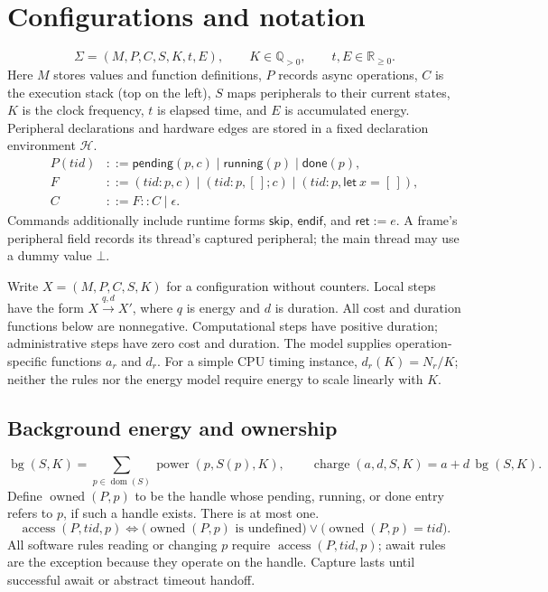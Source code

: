 \documentclass[11pt]{article}
\newcommand{\kw}[1]{\mathsf{#1}}
\newcommand{\step}[2]{\xrightarrow{#1,#2}}
\newcommand{\bg}{\operatorname{bg}}
\newcommand{\dom}{\operatorname{dom}}
\newcommand{\charge}{\operatorname{charge}}
\newcommand{\access}{\operatorname{access}}
\newcommand{\frm}[3]{(#1:#2,#3)}
\begin{document}
\section{Configurations and notation}
\[
\Sigma=(M,P,C,S,K,t,E),
\qquad K\in\mathbb{Q}_{>0},\qquad t,E\in\mathbb{R}_{\geq0}.
\]
Here $M$ stores values and function definitions, $P$ records async operations,
$C$ is the execution stack (top on the left), $S$ maps peripherals to their
current states, $K$ is the clock frequency, $t$ is elapsed time, and $E$ is
accumulated energy. Peripheral declarations and hardware edges are stored in
a fixed declaration environment $\mathcal H$.
\begin{align*}
P(tid)&::=\kw{pending}(p,c)\mid\kw{running}(p)\mid\kw{done}(p),\\
F&::=\frm{tid}{p}{c}
\mid\frm{tid}{p}{[\,];c}
\mid\frm{tid}{p}{\kw{let}\ x=[\,]},\\
C&::=F::C\mid\epsilon.
\end{align*}
Commands additionally include runtime forms $\kw{skip}$, $\kw{endif}$, and
$\kw{ret}:=e$. A frame's peripheral field records its thread's captured
peripheral; the main thread may use a dummy value $\bot$.

Write $X=(M,P,C,S,K)$ for a configuration without counters. Local steps have
the form $X\step{q}{d}X'$, where $q$ is energy and $d$ is duration.
All cost and duration functions below are nonnegative. Computational steps
have positive duration; administrative steps have zero cost and duration.
The model supplies operation-specific functions $a_r$ and $d_r$.
For a simple CPU timing instance, $d_r(K)=N_r/K$; neither the rules nor the
energy model require energy to scale linearly with $K$.

\subsection{Background energy and ownership}
\[
\bg(S,K)=\sum_{p\in\dom(S)}\operatorname{power}(p,S(p),K),
\qquad
\charge(a,d,S,K)=a+d\,\bg(S,K).
\]
Define $\operatorname{owned}(P,p)$ to be the handle whose pending, running,
or done entry refers to $p$, if such a handle exists. There is at most one.
\[
\access(P,tid,p)
\iff
\bigl(\operatorname{owned}(P,p)\text{ is undefined}\bigr)
\lor\bigl(\operatorname{owned}(P,p)=tid\bigr).
\]
All software rules reading or changing $p$ require $\access(P,tid,p)$;
await rules are the exception because they operate on the handle.
Capture lasts until successful await or abstract timeout handoff.
\end{document}

